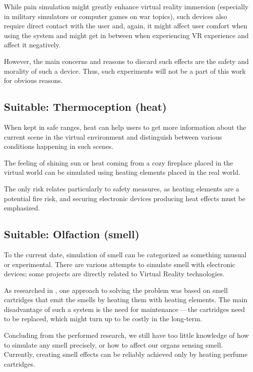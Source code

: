 While pain simulation might greatly enhance virtual reality immersion
(especially in military simulators or computer games on war topics),
such devices also require direct contact with the user and, again,
it might affect user comfort when using the system and might get in between
when experiencing VR experience and affect it negatively.


However, the main concerns and reasons to discard such effects are the
safety and morality of such a device. Thus, such experiments will not be
a part of this work for obvious reasons.


\hypertarget{x-suitable:-thermoception-(heat)}{\subsection{Suitable: Thermoception (heat)}}
When kept in safe ranges, heat can help users to get more information about the
current scene in the virtual environment and distinguish between various conditions
happening in such scenes.


The feeling of shining sun or heat coming from a cozy fireplace placed in the
virtual world can be simulated using heating elements placed in the real world.


The only risk relates particularly to safety measures, as heating elements are
a potential fire risk, and securing electronic devices producing heat effects
must be emphasized.


\hypertarget{x-suitable:-olfaction-(smell)}{\subsection{Suitable: Olfaction (smell)}}
To the current date, simulation of smell can be categorized as something unusual
or experimental. There are various attempts to simulate smell with electronic
devices; some projects are directly related to Virtual Reality technologies.


As researched in
\hyperlink{./03-current-state-of-effects#feelreal}{},
one approach to solving the problem was based on smell
cartridges that emit the smells by heating them with heating elements.
The main disadvantage of such a system is the need for maintenance — the
cartridges need to be replaced, which might turn up to be costly in the
long-term.


Concluding from the performed research, we still have too little
knowledge of how to simulate any smell precisely, or how to affect our organs
sensing smell. Currently, creating smell effects can be reliably achieved
only by heating perfume cartridges.


